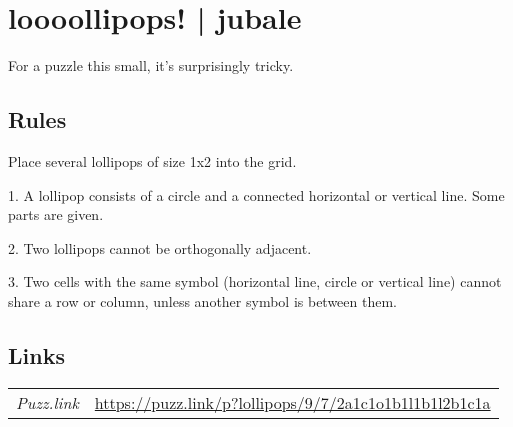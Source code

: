 \section[loooollipops! | jubale {[\emph{Lollipops}]}]{loooollipops! | {\normalfont jubale}}
\label{sec:55-loooollipops-jubale}
For a puzzle this small, it’s surprisingly tricky.
\subsection*{Rules}
\begin{markdown}
Place several lollipops of size 1x2 into the grid.



1. A lollipop consists of a circle and a connected horizontal or vertical line. Some parts are given.



2. Two lollipops cannot be orthogonally adjacent.



3. Two cells with the same symbol (horizontal line, circle or vertical line) cannot share a row or column, unless another symbol is between them.
\end{markdown}
\subsection*{Links}
\begin{tabularx}{\textwidth}{l X}
\emph{Puzz.link} & \url{https://puzz.link/p?lollipops/9/7/2a1c1o1b1l1b1l2b1c1a} \\
\end{tabularx}
\pagebreak
